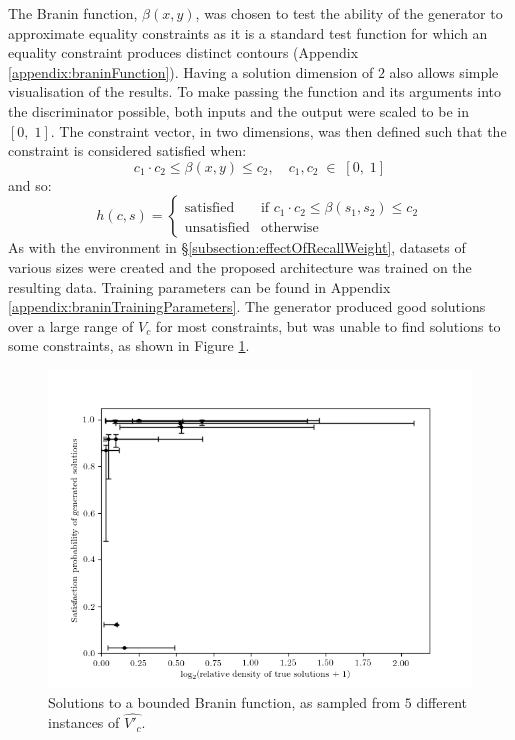 \documentclass[../../main.tex]{subfiles}
\begin{document}
The Branin function, $\beta(x,y)$, was chosen to test the ability of the generator to approximate equality constraints as it is a standard test function for which an equality constraint produces distinct contours (Appendix \ref{appendix:braninFunction}).
Having a solution dimension of $2$ also allows simple visualisation of the results.
To make passing the function and its arguments into the discriminator possible, both inputs and the output were scaled to be in $[0,\;1]$.
The constraint vector, in two dimensions, was then defined such that the constraint is considered satisfied when:
\begin{equation}
    c_1\cdot c_2\le\beta(x,y)\le c_2,\quad c_1,c_2\;\in\;[0,\;1]
\end{equation}
and so:
\begin{equation}
    h(c,s)=\left\{\begin{array}{ll}\text{satisfied}&\mbox{if }c_1\cdot c_2\le\beta(s_1,s_2)\le c_2\\\text{unsatisfied}&\mbox{otherwise}\end{array}\right.
\end{equation}
As with the environment in \S\ref{subsection:effectOfRecallWeight}, datasets of various sizes were created and the proposed architecture was trained on the resulting data.
Training parameters can be found in Appendix \ref{appendix:braninTrainingParameters}.
The generator produced good solutions over a large range of $V_c$ for most constraints, but was unable to find solutions to some constraints, as shown in Figure \ref{fig:braninPropertiesW3}.
\begin{figure}[H]
    \begin{center}
    \includegraphics[width=\textwidth]{braninPropertiesW1}
    \caption[Satisfaction probability and relative density of Branin constraints]{
        Solutions to a bounded Branin function, as sampled from $5$ different instances of $\hat{V'_c}$.
    }
    \label{fig:braninPropertiesW3}
    \end{center}
\end{figure}
\end{document}
